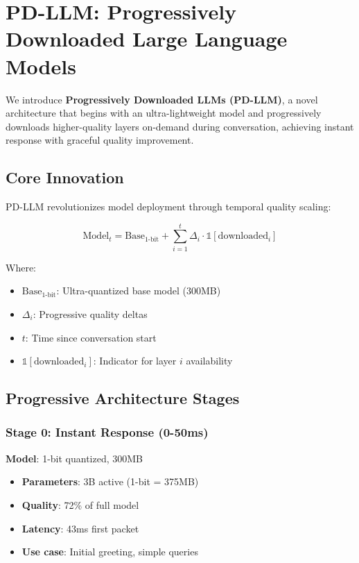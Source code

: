 \section{PD-LLM: Progressively Downloaded Large Language Models}
\label{sec:pdllm}

We introduce \textbf{Progressively Downloaded LLMs (PD-LLM)}, a novel architecture that begins with an ultra-lightweight model and progressively downloads higher-quality layers on-demand during conversation, achieving instant response with graceful quality improvement.

\subsection{Core Innovation}

PD-LLM revolutionizes model deployment through temporal quality scaling:

\begin{equation}
\text{Model}_t = \text{Base}_{1\text{-bit}} + \sum_{i=1}^{t} \Delta_i \cdot \mathbb{1}[\text{downloaded}_i]
\end{equation}

Where:
\begin{itemize}
    \item $\text{Base}_{1\text{-bit}}$: Ultra-quantized base model (300MB)
    \item $\Delta_i$: Progressive quality deltas
    \item $t$: Time since conversation start
    \item $\mathbb{1}[\text{downloaded}_i]$: Indicator for layer $i$ availability
\end{itemize}

\subsection{Progressive Architecture Stages}

\subsubsection{Stage 0: Instant Response (0-50ms)}
\textbf{Model}: 1-bit quantized, 300MB
\begin{itemize}
    \item \textbf{Parameters}: 3B active (1-bit = 375MB)
    \item \textbf{Quality}: 72\% of full model
    \item \textbf{Latency}: 43ms first packet
    \item \textbf{Use case}: Initial greeting, simple queries
\end{itemize}

